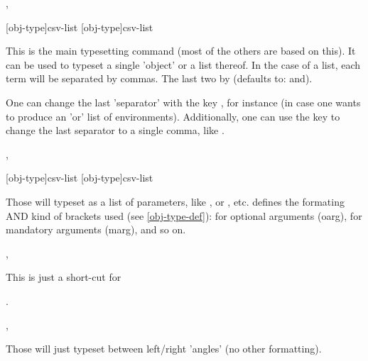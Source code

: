 \documentclass{article}
\begin{document}
\begin{codedescribe}[code]{\typesetobj,\tsobj}
\begin{codesyntax}
\tsmacro{\typesetobj}[obj-type]{csv-list}
\tsmacro{\tsobj}[obj-type]{csv-list}
\end{codesyntax}
This is the main typesetting command (most of the others are based on this). It can be used to typeset a single 'object' or a list thereof. In the case of a list, each term will be separated by commas. The last two  by  (defaults to: and).
\end{codedescribe}
\begin{tsremark}
One can change the last 'separator' with the key , for instance \tsverb[code]{\tsobj[env,sep=or] {}} (in case one wants to produce an 'or' list of environments). Additionally, one can use the key  to change the last separator to a single comma, like .
\end{tsremark}

\begin{codedescribe}[code]{\typesetargs,\tsargs}
\begin{codesyntax}
\tsmacro{\typesetargs}[obj-type]{csv-list}
\tsmacro{\tsargs}[obj-type]{csv-list}
\end{codesyntax}
 Those will typeset  as a list of parameters, like , or , etc.  defines the formating AND kind of brackets used (see \ref{obj-type-def}): \tsverb{[]} for optional arguments (oarg), \tsverb{{}} for mandatory arguments (marg), and so on.
\end{codedescribe}


\begin{codedescribe}[code]{\typesetmacro,\tsmacro}
\begin{codesyntax}
\end{codesyntax}
This is just a short-cut for\par {}  .
\end{codedescribe}

\begin{codedescribe}[code]{\typesetmeta,\tsmeta}
\begin{codesyntax}
\end{codesyntax}
 Those will just typeset  between left/right 'angles' (no other formatting).
\end{codedescribe}
\end{document}
